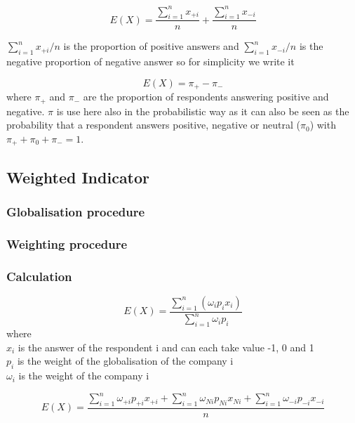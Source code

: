 \documentclass[12pt,a4paper,oneside]{book}
\begin{document}
\begin{equation}
    E(X) = \frac{\sum_{i=1}^n x_{+i}}{n}  + \frac{\sum_{i=1}^n x_{-i}}{n}
\end{equation} 

${\sum_{i=1}^n x_{+i}}/{n}$ is the proportion of positive answers and ${\sum_{i=1}^n x_{-i}}/{n}$ is the negative proportion of negative answer so for simplicity we write it 

\begin{equation}
    E(X) = \pi_+ - \pi_-
\end{equation}
where $\pi_+$ and $\pi_-$ are the proportion of respondents answering positive and negative. $\pi$ is use here also in the probabilistic way as it can also be seen as the probability that a respondent answers positive, negative or neutral ($\pi_0$) with $\pi_+ + \pi_0 + \pi_- =1$.


\subsection{Weighted Indicator}

\subsubsection{Globalisation procedure}

\subsubsection{Weighting procedure}

\subsubsection{Calculation}

\begin{equation}
    E(X) = \frac{ \sum_{i=1}^n \left(\omega_i p_i x_i \right)}{\sum_{i=1}^n \omega_i p_i}
\end{equation} 
where \\
$x_i$ is the answer of the respondent i and can each take value -1, 0 and 1 \\
$p_i$ is the weight of the globalisation of the company i \\
$\omega_i$ is the weight of the company i


\begin{equation}
    E(X) = \frac{ \sum_{i=1}^n \omega_{+i} p_{+i} x_{+i} + \sum_{i=1}^n \omega_{Ni} p_{Ni} x_{Ni} + \sum_{i=1}^n \omega_{-i} p_{-i} x_{-i}}{n}
\end{equation} 
\end{document}
